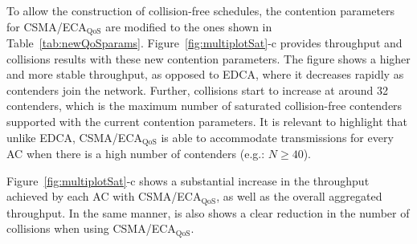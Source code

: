 \begin{itemize}
To allow the construction of collision-free schedules, the contention parameters for CSMA/ECA$_{\text{QoS}}$ are modified to the ones shown in Table~\ref{tab:newQoSparams}. Figure~\ref{fig:multiplotSat}-c provides throughput and collisions results with these new contention parameters. The figure shows a higher and more stable throughput, as opposed to EDCA, where it decreases rapidly as contenders join the network. Further, collisions start to increase at around 32 contenders, which is the maximum number of saturated collision-free contenders supported with the current contention parameters. It is relevant to highlight that unlike EDCA, CSMA/ECA$_{\text{QoS}}$ is able to accommodate transmissions for every AC when there is a high number of contenders (e.g.: $N\geq 40$).

%

Figure~\ref{fig:multiplotSat}-c shows a substantial increase in the throughput achieved by each AC with CSMA/ECA$_{\text{QoS}}$, as well as the overall aggregated throughput. In the same manner, is also shows a clear reduction in the number of collisions when using CSMA/ECA$_{\text{QoS}}$.

%


\end{itemize}
